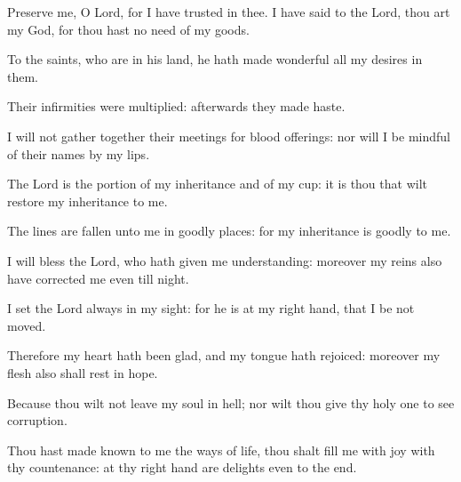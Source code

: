 \item Preserve me, O Lord, for I have trusted in thee. I have said to the Lord, thou art my God, for thou hast no need of my goods.
\item To the saints, who are in his land, he hath made wonderful all my desires in them.
\item Their infirmities were multiplied: afterwards they made haste.
\item I will not gather together their meetings for blood offerings: nor will I be mindful of their names by my lips.
\item The Lord is the portion of my inheritance and of my cup: it is thou that wilt restore my inheritance to me.
\item The lines are fallen unto me in goodly places: for my inheritance is goodly to me.
\item I will bless the Lord, who hath given me understanding: moreover my reins also have corrected me even till night.
\item I set the Lord always in my sight: for he is at my right hand, that I be not moved.
\item Therefore my heart hath been glad, and my tongue hath rejoiced: moreover my flesh also shall rest in hope.
\item Because thou wilt not leave my soul in hell; nor wilt thou give thy holy one to see corruption.
\item Thou hast made known to me the ways of life, thou shalt fill me with joy with thy countenance: at thy right hand are delights even to the end.
